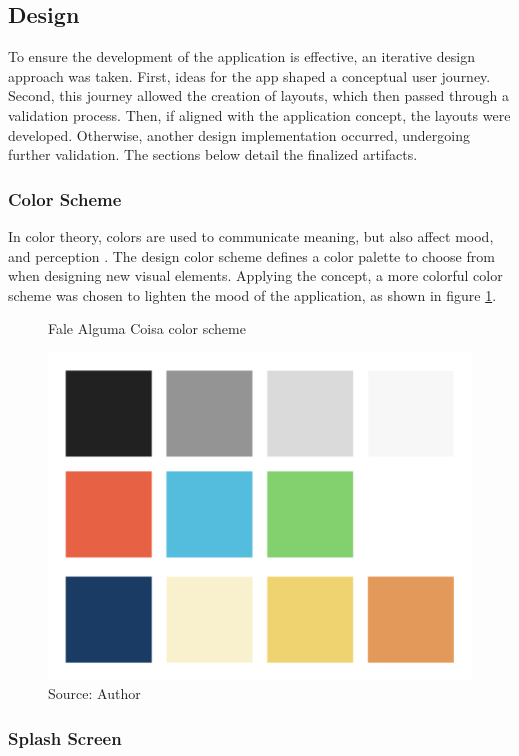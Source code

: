 \clearpage
\subsection{Design}
\label{sec:app-design}

To ensure the development of the application is effective, an iterative design approach was taken. First, ideas for the app shaped a conceptual user journey. Second, this journey allowed the creation of layouts, which then passed through a validation process. Then, if aligned with the application concept, the layouts were developed. Otherwise, another design implementation occurred, undergoing further validation. The sections below detail the finalized artifacts.

\subsubsection{Color Scheme}

In color theory, colors are used to communicate meaning, but also affect mood, and perception \cite{agoston2013color}. The design color scheme defines a color palette to choose from when designing new visual elements. Applying the concept, a more colorful color scheme was chosen to lighten the mood of the application, as shown in figure \ref{fig:falealgumacoisa-color-scheme}.

\begin{figure}[ht]
    \centering
    \caption{Fale Alguma Coisa color scheme}
    \includegraphics[width=.8\linewidth]{images/app/colors.png}
    \caption*{Source: Author}
    \label{fig:falealgumacoisa-color-scheme}
\end{figure}

\clearpage
\subsubsection{Splash Screen}

